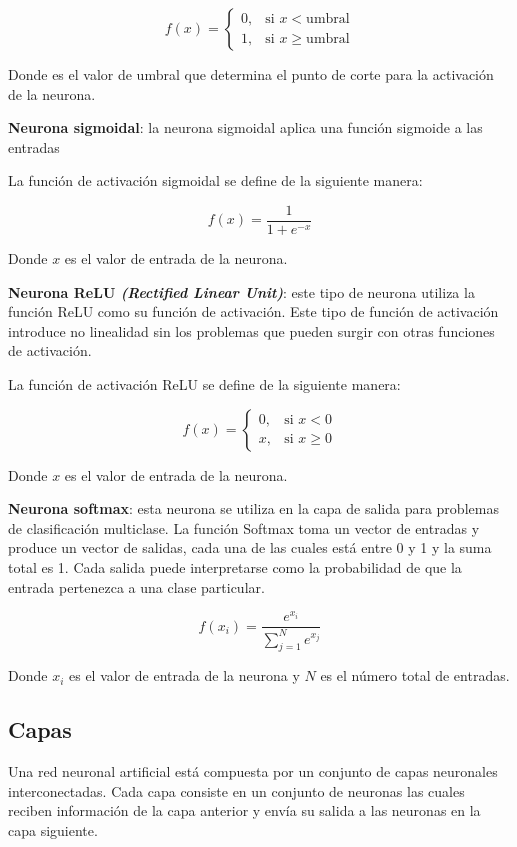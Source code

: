 \[
f(x) = \begin{cases}
    0, & \text{si } x < \text{umbral} \\
    1, & \text{si } x \geq \text{umbral}
\end{cases}
\]

Donde  es el valor de umbral que determina el punto de corte para la activación de la neurona.

\textbf{Neurona sigmoidal}: la neurona sigmoidal aplica una función sigmoide a las entradas

La función de activación sigmoidal se define de la siguiente manera:

\[
f(x) = \frac{1}{1 + e^{-x}}
\]

Donde $x$ es el valor de entrada de la neurona.

\textbf{Neurona ReLU \textit{(Rectified Linear Unit)}}: este tipo de neurona utiliza la función ReLU como su función de activación.
Este tipo de función de activación introduce no linealidad sin los problemas que pueden surgir con otras funciones de activación.

La función de activación ReLU se define de la siguiente manera:

\[
f(x) = \begin{cases}
    0, & \text{si } x < 0 \\
    x, & \text{si } x \geq 0
\end{cases}
\]

Donde $x$ es el valor de entrada de la neurona.

\textbf{Neurona softmax}: esta neurona se utiliza en la capa de salida para problemas de clasificación multiclase. La función Softmax toma un vector de entradas y produce un vector de salidas, cada una de las cuales está entre 0 y 1 y la suma total es 1. 
Cada salida puede interpretarse como la probabilidad de que la entrada pertenezca a una clase particular.

\[
f(x_i) = \frac{e^{x_i}}{\sum_{j=1}^{N} e^{x_j}}
\]

Donde $x_i$ es el valor de entrada de la neurona y $N$ es el número total de entradas.

\subsection{Capas}
Una red neuronal artificial está compuesta por un conjunto de capas neuronales interconectadas. 
Cada capa consiste en un conjunto de neuronas las cuales reciben información de la capa anterior y envía su salida a las neuronas en la capa siguiente.

